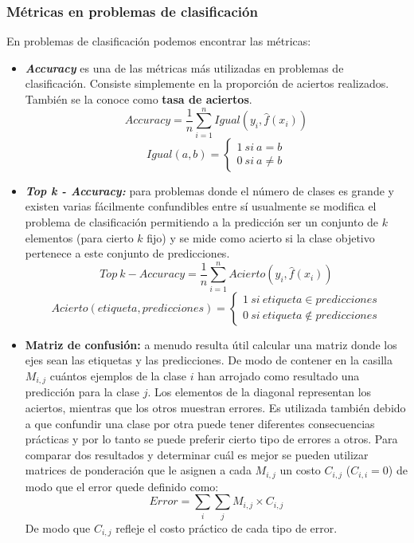 \subsubsection{Métricas en problemas de clasificación}
En problemas de clasificación podemos encontrar las métricas:
\begin{itemize}
    \item \textit{\textbf{Accuracy}} es una de las métricas más utilizadas en problemas de clasificación. Consiste simplemente en la proporción de aciertos realizados. También se la conoce como \textbf{tasa de aciertos}.
    \begin{equation*}
        Accuracy = \frac{1}{n} \sum_{i=1}^n Igual( y_i, \hat{f}(x_i) )
    \end{equation*}
    \begin{equation*}
        Igual(a,b) = \left\lbrace\begin{array}{c} 1~si~a = b \\  0~si~a \neq b \end{array}\right.
    \end{equation*}
    \item \textit{\textbf{Top k - Accuracy:}} para problemas donde el número de clases es grande y existen varias fácilmente confundibles entre sí usualmente se modifica el problema de clasificación permitiendo a la predicción ser un conjunto de $k$ elementos (para cierto $k$ fijo) y se mide como acierto si la clase objetivo pertenece a este conjunto de predicciones.
    \begin{equation*}
        Top~k-Accuracy = \frac{1}{n} \sum_{i=1}^n Acierto( y_i, \hat{f}(x_i) )
    \end{equation*}
    \begin{equation*}
        Acierto(etiqueta, predicciones) = \left\lbrace\begin{array}{c} 1~si~etiqueta \in predicciones \\  0~si~etiqueta \notin predicciones \end{array}\right.
    \end{equation*}
    \item \textbf{Matriz de confusión:} a menudo resulta útil calcular una matriz donde los ejes sean las etiquetas y las predicciones. De modo de contener en la casilla $M_{i,j}$ cuántos ejemplos de la clase $i$ han arrojado como resultado una predicción para la clase $j$.
    Los elementos de la diagonal representan los aciertos, mientras que los otros muestran errores.
    Es utilizada también debido a que confundir una clase por otra puede tener diferentes consecuencias prácticas y por lo tanto se puede preferir cierto tipo de errores a otros. Para comparar dos resultados y determinar cuál es mejor se pueden utilizar matrices de ponderación que le asignen a cada $M_{i,j}$ un costo $C_{i,j}$ ($C_{i,i} = 0$) de modo que el error quede definido como:
    \begin{equation*}
        Error = \sum_{i}\sum_{j}M_{i,j} \times C_{i,j}
    \end{equation*}
    De modo que $C_{i,j}$ refleje el costo práctico de cada tipo de error.
\end{itemize}

